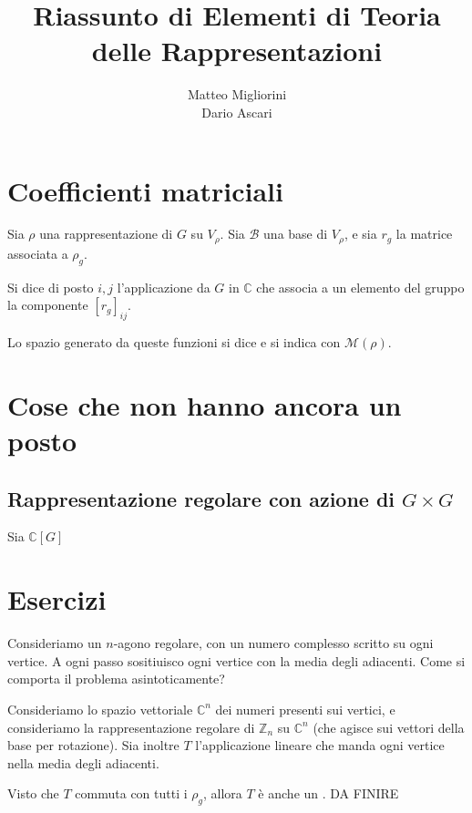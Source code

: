 \documentclass[a4paper,10pt,oneside]{math_article}
\title{Riassunto di Elementi di Teoria delle Rappresentazioni}
\author{Matteo Migliorini \\ Dario Ascari}
\date{}
\newcommand{\Cyc}{\mathbb Z}
\begin{document}
 
 
 \maketitle
 
 \cleardoublepage	
 
 \cleardoublepage
 \tableofcontents
 \cleardoublepage
 
 
 
 
 
 
 

  \section{Coefficienti matriciali}
    \begin{mydef}
     Sia $\rho$ una rappresentazione di $G$ su $V_\rho$. Sia $\mathcal B$ una base di $V_\rho$, e sia $r_g$ la matrice associata a $\rho_g$.
     
     Si dice  di posto $i,j$ l'applicazione da $G$ in $\mathbb C$ che associa a un elemento del gruppo la componente $[r_g]_{ij}$.
     
     Lo spazio generato da queste funzioni si dice  e si indica con $\mathcal M(\rho)$.
    \end{mydef}

 
  \section{Cose che non hanno ancora un posto}
   \subsection{Rappresentazione regolare con azione di $G\times G$}
   Sia $\mathbb C[G]$ 
  \section{Esercizi}
  \begin{myex}
   Consideriamo un $n$-agono regolare, con un numero complesso scritto su ogni vertice. A ogni passo sositiuisco ogni vertice con la media degli adiacenti. Come si comporta il problema asintoticamente?
   
   Consideriamo lo spazio vettoriale $\mathbb C^n$ dei numeri presenti sui vertici, e consideriamo la rappresentazione regolare di $\Cyc_n$ su $\mathbb C^n$ (che agisce sui vettori della base per rotazione). Sia inoltre $T$ l'applicazione lineare che manda ogni vertice nella media degli adiacenti.
   
   Visto che $T$ commuta con tutti i $\rho_g$, allora $T$ è anche un . DA FINIRE
  \end{myex}
\end{document}
